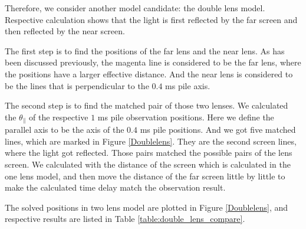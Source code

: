 \documentclass{emulateapj}
\begin{document}
Therefore, we consider another model candidate: the double lens model. Respective calculation shows that the light is first reflected by the far screen and then reflected by the near screen. 

The first step is to find the positions of the far lens and the near lens. As has been discussed previously, the magenta line is considered to be the far lens, where the positions have a larger effective distance. And the near lens is considered to be the lines that is perpendicular to the $0.4$ ms pile axis. 

The second step is to find the matched pair of those two lenses. We calculated the $\theta_{\parallel}$ of the respective $1$ ms pile observation positions. Here we define the parallel axis to be the axis of the $0.4$ ms pile positions. And we got five matched lines, which are marked in Figure \ref{Doublelens}. They are the second screen lines, where the light got reflected. Those pairs matched the possible pairs of the lens screen. We calculated with the distance of the screen which is calculated in the one lens model, and then move the distance of the far screen little by little to make the calculated time delay match the observation result.

The solved positions in two lens model are plotted in Figure \ref{Doublelens}, and respective results are listed in Table \ref{table:double_lens_compare}.  



\end{document}
